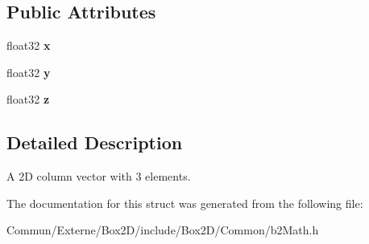 \subsection*{Public Attributes}
\begin{DoxyCompactItemize}
\item 
float32 {\bfseries x}\hypertarget{structb2_vec3_aedc5e37849caa413a8e767fc47741db2}{}\label{structb2_vec3_aedc5e37849caa413a8e767fc47741db2}

\item 
float32 {\bfseries y}\hypertarget{structb2_vec3_af5a7e99d13d02ff9abb323838d44d3b1}{}\label{structb2_vec3_af5a7e99d13d02ff9abb323838d44d3b1}

\item 
float32 {\bfseries z}\hypertarget{structb2_vec3_a7cb88968ff10fa500df0b10f5c425536}{}\label{structb2_vec3_a7cb88968ff10fa500df0b10f5c425536}

\end{DoxyCompactItemize}


\subsection{Detailed Description}
A 2D column vector with 3 elements. 

The documentation for this struct was generated from the following file\+:\begin{DoxyCompactItemize}
\item 
Commun/\+Externe/\+Box2\+D/include/\+Box2\+D/\+Common/b2\+Math.\+h\end{DoxyCompactItemize}

